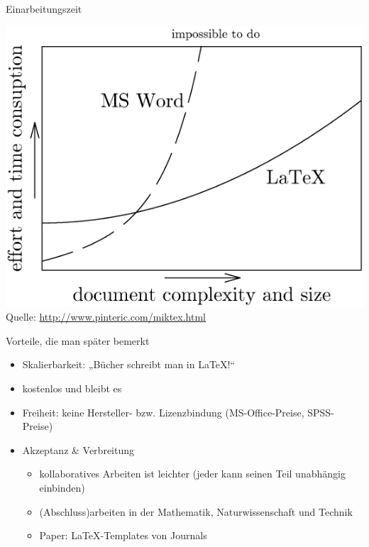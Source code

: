 \begin{frame}{Einarbeitungszeit}

\includegraphics[width=\textwidth*0.8,height=\textheight*0.8,keepaspectratio]{../img/miktex.png} Quelle:
\url{http://www.pinteric.com/miktex.html}

\end{frame}

\begin{frame}{Vorteile, die man später bemerkt}

\begin{itemize}
\itemsep1pt\parskip0pt
\item
  Skalierbarkeit: „Bücher schreibt man in \LaTeX!``
\item
  kostenlos und bleibt es
\item
  Freiheit: keine Hersteller- bzw. Lizenzbindung (MS-Office-Preise,
  SPSS-Preise)
\item
  Akzeptanz \& Verbreitung

  \begin{itemize}
  \itemsep1pt\parskip0pt
  \item
    kollaboratives Arbeiten ist leichter (jeder kann seinen Teil
    unabhängig einbinden)
  \item
    (Abschluss)arbeiten in der Mathematik, Naturwissenschaft und Technik
  \item
    Paper: \LaTeX-Templates von Journals
  \end{itemize}
\end{itemize}

\end{frame}

